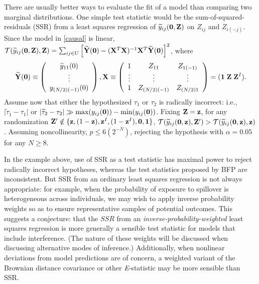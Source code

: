 There are usually better ways to evaluate the fit of a model than comparing
two marginal distributions. One simple test statistic would be the
sum-of-squared-residuals (SSR) from a least squares regression of $\widetilde
y_{ij}(\mathbf{0},\mathbf{Z})$ on $Z_{ij}$ and $Z_{i(-j)}$. Since the model in \eqref{causal}
is linear, $\mathcal{T}(\widetilde y_{ij}(\mathbf{0},\mathbf{Z}), \mathbf{Z}) = \sum_{ij \in U} \left[
  \widetilde {\mathbf{Y}}(\mathbf{0}) - (\mathbf{X}^T\mathbf{X})^{-1}\mathbf{X}^T \widetilde {\mathbf{Y}}(\mathbf{0}) \right]^2$, where $$
\widetilde {\mathbf{Y}}(\mathbf{0}) \equiv \left( \begin{array}{c} \widetilde y_{11}(0) \\
    \vdots \\ y_{(N/2)(-1)}(0) \end{array} \right), \mathbf{X} \equiv  \left(
  \begin{array}{ccc} 1 & Z_{11} & Z_{1(-1)} \\ \vdots & \vdots & \vdots  \\ 1
    & Z_{(N/2)(-1)} & Z_{(N/2)1} \end{array} \right) = ({\bf 1} \; \mathbf{Z} \;
\mathbf{Z}^I).  $$ Assume now that either the hypothesized $\tau_1$ or $\tau_2$ is
radically incorrect: i.e., $\vert \widetilde\tau_1 - \tau_1 \vert$ or $\vert
\widetilde\tau_2 - \tau_2 \vert \gg \max(y_{ij}(\mathbf{0})) - \min(y_{ij}(\mathbf{0}))$.
Fixing $\mathbf{Z} = \mathbf{z}$, for any randomization $\mathbf{Z}' \notin \{\mathbf{z}, (1-\mathbf{z}), \mathbf{z}^I,
(1-\mathbf{z}^I), \mathbf{0}, \mathbf{1} \}$, $\mathcal{T}(\widetilde y_{ij}(\mathbf{0},\mathbf{z}),\mathbf{Z}') > \mathcal{T}(\widetilde
y_{ij}(\mathbf{0},\mathbf{z}),\mathbf{z})$. Assuming noncollinearity,
$p \leq 6  \left( 2^{-N} \right)$, rejecting the hypothesis with $\alpha =
0.05$ for any $N \geq 8$. %

In the example above, use of SSR as a test statistic has maximal power to
reject radically incorrect hypotheses, whereas the test statistics proposed by
BFP are inconsistent. But SSR from an ordinary least squares regression is not
always appropriate: for example, when the probability of exposure to spillover
is heterogeneous across individuals, we may wish to apply inverse probability
weights so as to ensure representative samples of potential outcomes. This
suggests a conjecture: that the $SSR$ from an {\it
  inverse-probability-weighted} least squares regression is more generally a
sensible test statistic for models that include interference.  (The nature of
these weights will be discussed when discussing alternative modes of
inference.) Additionally, when nonlinear deviations from model predictions are
of concern, a weighted variant of the Brownian distance covariance
\cite{szekely2009brownian} or other {\it E}-statistic may be more sensible
than SSR.

